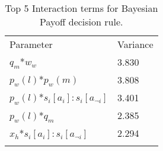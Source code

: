 \begin{table}[H]
\caption{Top 5 Interaction terms for Bayesian Payoff decision rule. \label{tab:sa_interaction_payoff_group_iqr_iqr}}
\begin{tabular} {ll}
\hline\noalign{\smallskip}
Parameter & Variance \\
\noalign{\smallskip}\svhline\noalign{\smallskip}
\(q_{m}\)*\(w_{w}\) & 3.830\\
\(p_{w}(l)\)*\(p_{w}(m)\) & 3.808\\
\(p_{w}(l)\)*\(s_{i}[a_{i}]:s_{i}[a_{\neg i}]\) & 3.401\\
\(p_{w}(l)\)*\(q_{m}\) & 2.385\\
\(x_{h}\)*\(s_{i}[a_{i}]:s_{i}[a_{\neg i}]\) & 2.294\\ 
\noalign{\smallskip}\hline\noalign{\smallskip}
\end{tabular}
\end{table}

